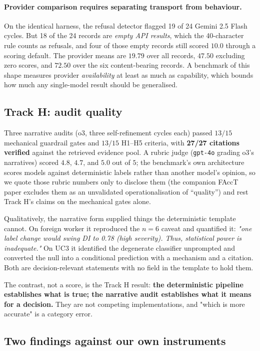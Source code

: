 \documentclass[10pt,letterpaper]{article}
\begin{document}
\paragraph{Provider comparison requires separating transport from behaviour.}
On the identical harness, the refusal detector flagged 19 of 24 Gemini 2.5
Flash cycles. But 18 of the 24 records are \emph{empty API results}, which
the 40-character rule counts as refusals, and four of those empty records
still scored $10.0$ through a scoring default. The provider means are $19.79$
over all records, $47.50$ excluding zero scores, and $72.50$ over the six
content-bearing records. A benchmark of this shape measures provider
\emph{availability} at least as much as capability, which bounds how much any
single-model result should be generalised.

\subsection{Track H: audit quality}

Three narrative audits (o3, three self-refinement cycles each) passed $13/15$
mechanical guardrail gates and $13/15$ H1--H5 criteria, with \textbf{27/27
citations verified} against the retrieved evidence pool. A rubric judge
(\texttt{gpt-4o} grading o3's narratives) scored $4.8$, $4.7$, and $5.0$ out of
$5$; the benchmark's own architecture scores models against deterministic
labels rather than another model's opinion, so we quote those rubric numbers
only to disclose them (the companion FAccT paper excludes them as an
unvalidated operationalisation of ``quality'') and rest Track H's claims on
the mechanical gates alone.

Qualitatively, the narrative form supplied things the deterministic template
cannot. On foreign worker it reproduced the $n{=}6$ caveat and quantified it:
\emph{"one label change would swing DI to 0.78 (high severity). Thus,
statistical power is inadequate."} On UC3 it identified the degenerate
classifier unprompted and converted the null into a conditional prediction with
a mechanism and a citation. Both are decision-relevant statements with no field
in the template to hold them.

The contrast, not a score, is the Track H result: \textbf{the deterministic
pipeline establishes what is true; the narrative audit establishes what it means
for a decision.} They are not competing implementations, and "which is more
accurate" is a category error.

\subsection{Two findings against our own instruments}
\label{sec:instruments}
\end{document}
